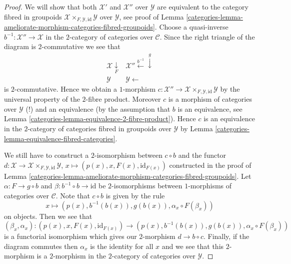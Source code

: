 \begin{proof}

We will show that both $\mathcal{X}'$ and $\mathcal{X}''$ over $\mathcal{Y}$
are equivalent to the category fibred in groupoids
$\mathcal{X} \times_{F, \mathcal{Y}, \text{id}} \mathcal{Y}$
over $\mathcal{Y}$, see proof of
Lemma \ref{categories-lemma-ameliorate-morphism-categories-fibred-groupoids}.
Choose a quasi-inverse $b^{-1} : \mathcal{X}'' \to \mathcal{X}$ in the
$2$-category of categories over $\mathcal{C}$.
Since the right triangle of the diagram is $2$-commutative we see that
$$
\begin{array}{cc}\mathcal{X} \underset{F}{\downarrow} & \mathcal{X}'' \overset{b^{-1}}{\longleftarrow}\overset{g}{\downarrow} \\ \mathcal{Y} & \mathcal{Y} \longleftarrow\end{array}
$$
is $2$-commutative. Hence we obtain a $1$-morphism
$c : \mathcal{X}'' \to
\mathcal{X} \times_{F, \mathcal{Y}, \text{id}} \mathcal{Y}$
by the universal property of the $2$-fibre product. Moreover $c$
is a morphism of categories over $\mathcal{Y}$ (!) and an equivalence
(by the assumption that $b$ is an equivalence, see
Lemma \ref{categories-lemma-equivalence-2-fibre-product}).
Hence $c$ is an equivalence in the $2$-category of categories fibred
in groupoids over $\mathcal{Y}$ by
Lemma \ref{categories-lemma-equivalence-fibred-categories}.

\medskip\noindent
We still have to construct a $2$-isomorphism between $c \circ b$ and
the functor $d : \mathcal{X} \to
\mathcal{X} \times_{F, \mathcal{Y}, \text{id}} \mathcal{Y}$,
$x \mapsto (p(x), x, F(x), \text{id}_{F(x)})$
constructed in the proof of
Lemma \ref{categories-lemma-ameliorate-morphism-categories-fibred-groupoids}.
Let $\alpha : F \to g \circ b$ and $\beta : b^{-1} \circ b \to \text{id}$
be $2$-isomorphisms between $1$-morphisms of categories over $\mathcal{C}$.
Note that $c \circ b$ is given by the rule
$$
x \mapsto (p(x), b^{-1}(b(x)), g(b(x)), \alpha_x \circ F(\beta_x))
$$
on objects. Then we see that
$$
(\beta_x, \alpha_x) :
(p(x), x, F(x), \text{id}_{F(x)})
\longrightarrow
(p(x), b^{-1}(b(x)), g(b(x)), \alpha_x \circ F(\beta_x))
$$
is a functorial isomorphism which gives our $2$-morphism
$d \to b \circ c$. Finally, if the diagram commutes then
$\alpha_x$ is the identity for all $x$ and we see that this
$2$-morphism is a $2$-morphism in the $2$-category of categories
over $\mathcal{Y}$.
\end{proof}

